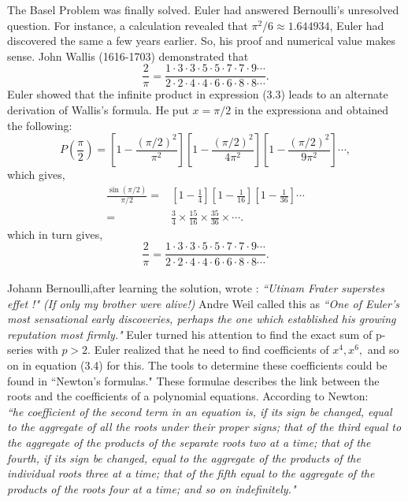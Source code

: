 \documentclass[a4paper,reqno,11pt]{amsart}
\theoremstyle{plain}%
\begin{document}
\begin{Proof}
The Basel Problem was finally solved. Euler had answered Bernoulli's unresolved question. For instance, a calculation revealed that $\pi^2 /6 \approx 1.644934$, Euler had discovered the same a few years earlier. So, his proof and numerical value makes sense. John Wallis (1616-1703) demonstrated that\\
$$ \frac{2}{\pi} = \frac{1\cdot3\cdot3\cdot5\cdot5\cdot7\cdot7\cdot9\cdots}{2\cdot2\cdot4\cdot4\cdot6\cdot6\cdot8\cdot8\cdots}.$$
Euler showed that the infinite product in expression (3.3) leads to an 
alternate derivation of Wallis's formula. He put $x = \pi/2$ in the expressiona and obtained the following:
$$P\left(\frac{\pi}{2}\right) = \left[1 - \frac{(\pi/2)^2}{\pi^2}\right]\left[1 - \frac{(\pi/2)^2}{4\pi^2}\right]\left[1 - \frac{(\pi/2)^2}{9\pi^2}\right]\cdots,$$
which gives,\\
\begin{align*}
\frac{\sin(\pi/2)}{\pi/2} =& \left[1-\frac{1}{4}\right]\left[1-\frac{1}{16}\right]\left[1-\frac{1}{36}\right]\cdots\\
=&  \frac{3}{4} \times \frac{15}{16} \times \frac{35}{36} \times \cdots.
\end{align*}
which in  turn gives,
$$ \frac{2}{\pi} = \frac{1\cdot3\cdot3\cdot5\cdot5\cdot7\cdot7\cdot9\cdots}{2\cdot2\cdot4\cdot4\cdot6\cdot6\cdot8\cdot8\cdots}.$$
\\
Johann Bernoulli,after learning the solution, wrote : \textit{``Utinam Frater superstes effet !" (If only my brother were alive!)}
Andre Weil called this as \textit{``One of Euler's most sensational early discoveries, perhaps the one which established his growing reputation most firmly."} Euler turned his attention to find the exact sum of p-series 
with $p > 2$. Euler realized that he need to find coefficients of $x^4, x^6,$ and so on in equation (3.4) for this. The tools to determine these coefficients could be found in ``Newton's formulas." These formulae describes the link between the roots and the coefficients of a polynomial equations. According to Newton:\\
\indent \textit{``he coefficient of the second term in an equation is, if its sign be changed, equal to the aggregate of all the roots under their proper 
signs; that of the third equal to the aggregate of the products of the 
separate roots two at a time; that of the fourth, if its sign be changed, 
equal to the aggregate of the products of the individual roots three at 
a time; that of the fifth equal to the aggregate of the products of the 
roots four at a time; and so on indefinitely."}\cite{ref 1}\\

\end{Proof}
\end{document}
